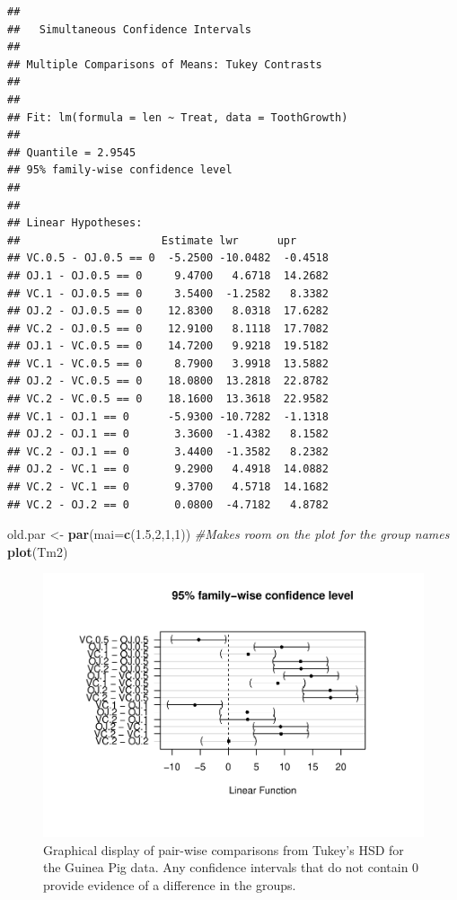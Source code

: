 \documentclass[]{book}
\newenvironment{Shaded}{\begin{snugshade}}{\end{snugshade}}
\newcommand{\KeywordTok}[1]{\textcolor[rgb]{0.13,0.29,0.53}{\textbf{#1}}}
\newcommand{\DataTypeTok}[1]{\textcolor[rgb]{0.13,0.29,0.53}{#1}}
\newcommand{\DecValTok}[1]{\textcolor[rgb]{0.00,0.00,0.81}{#1}}
\newcommand{\FloatTok}[1]{\textcolor[rgb]{0.00,0.00,0.81}{#1}}
\newcommand{\StringTok}[1]{\textcolor[rgb]{0.31,0.60,0.02}{#1}}
\newcommand{\CommentTok}[1]{\textcolor[rgb]{0.56,0.35,0.01}{\textit{#1}}}
\newcommand{\NormalTok}[1]{#1}
\theoremstyle{definition}
\theoremstyle{definition}
\theoremstyle{remark}
\begin{document}
\begin{verbatim}
## 
##   Simultaneous Confidence Intervals
## 
## Multiple Comparisons of Means: Tukey Contrasts
## 
## 
## Fit: lm(formula = len ~ Treat, data = ToothGrowth)
## 
## Quantile = 2.9545
## 95% family-wise confidence level
##  
## 
## Linear Hypotheses:
##                      Estimate lwr      upr     
## VC.0.5 - OJ.0.5 == 0  -5.2500 -10.0482  -0.4518
## OJ.1 - OJ.0.5 == 0     9.4700   4.6718  14.2682
## VC.1 - OJ.0.5 == 0     3.5400  -1.2582   8.3382
## OJ.2 - OJ.0.5 == 0    12.8300   8.0318  17.6282
## VC.2 - OJ.0.5 == 0    12.9100   8.1118  17.7082
## OJ.1 - VC.0.5 == 0    14.7200   9.9218  19.5182
## VC.1 - VC.0.5 == 0     8.7900   3.9918  13.5882
## OJ.2 - VC.0.5 == 0    18.0800  13.2818  22.8782
## VC.2 - VC.0.5 == 0    18.1600  13.3618  22.9582
## VC.1 - OJ.1 == 0      -5.9300 -10.7282  -1.1318
## OJ.2 - OJ.1 == 0       3.3600  -1.4382   8.1582
## VC.2 - OJ.1 == 0       3.4400  -1.3582   8.2382
## OJ.2 - VC.1 == 0       9.2900   4.4918  14.0882
## VC.2 - VC.1 == 0       9.3700   4.5718  14.1682
## VC.2 - OJ.2 == 0       0.0800  -4.7182   4.8782
\end{verbatim}

\begin{Shaded}
\begin{Highlighting}[]
\NormalTok{old.par <-}\StringTok{ }\KeywordTok{par}\NormalTok{(}\DataTypeTok{mai=}\KeywordTok{c}\NormalTok{(}\FloatTok{1.5}\NormalTok{,}\DecValTok{2}\NormalTok{,}\DecValTok{1}\NormalTok{,}\DecValTok{1}\NormalTok{)) }\CommentTok{#Makes room on the plot for the group names}
\KeywordTok{plot}\NormalTok{(Tm2)}
\end{Highlighting}
\end{Shaded}

\begin{figure}
\centering
\includegraphics{03-oneWayAnova_files/figure-latex/Figure3-19-1.pdf}
\caption{\label{fig:Figure3-19}Graphical display of pair-wise comparisons from Tukey's
HSD for the Guinea Pig data. Any confidence intervals that do not
contain 0 provide evidence of a difference in the groups.}
\end{figure}
\end{document}
